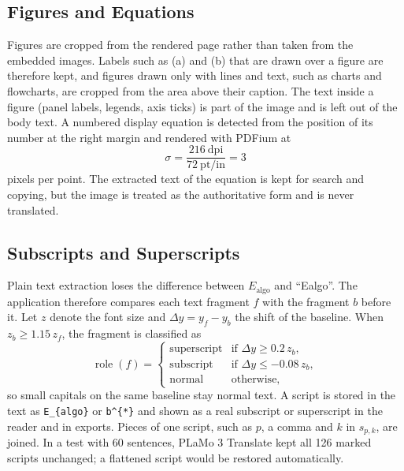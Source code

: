 \documentclass[11pt]{article}
\begin{document}
\subsection{Figures and Equations}
Figures are cropped from the rendered page rather than taken from the embedded images. Labels such as (a) and (b) that are drawn over a figure are therefore kept, and figures drawn only with lines and text, such as charts and flowcharts, are cropped from the area above their caption. The text inside a figure (panel labels, legends, axis ticks) is part of the image and is left out of the body text. A numbered display equation is detected from the position of its number at the right margin and rendered with PDFium at
\begin{equation}
  \sigma = \frac{216\ \text{dpi}}{72\ \text{pt/in}} = 3
  \label{eq:scale}
\end{equation}
pixels per point. The extracted text of the equation is kept for search and copying, but the image is treated as the authoritative form and is never translated.

\subsection{Subscripts and Superscripts}
\label{sec:scripts}
Plain text extraction loses the difference between $E_\text{algo}$ and ``Ealgo''. The application therefore compares each text fragment $f$ with the fragment $b$ before it. Let $z$ denote the font size and $\Delta y = y_f - y_b$ the shift of the baseline. When $z_b \ge 1.15\, z_f$, the fragment is classified as
\begin{equation}
  \operatorname{role}(f) =
  \begin{cases}
    \text{superscript} & \text{if } \Delta y \ge 0.2\, z_b,\\
    \text{subscript} & \text{if } \Delta y \le -0.08\, z_b,\\
    \text{normal} & \text{otherwise,}
  \end{cases}
  \label{eq:scripts}
\end{equation}
so small capitals on the same baseline stay normal text. A script is stored in the text as \verb|E_{algo}| or \verb|b^{*}| and shown as a real subscript or superscript in the reader and in exports. Pieces of one script, such as $p$, a comma and $k$ in $s_{p,k}$, are joined. In a test with 60 sentences, PLaMo 3 Translate kept all 126 marked scripts unchanged; a flattened script would be restored automatically.
\end{document}
